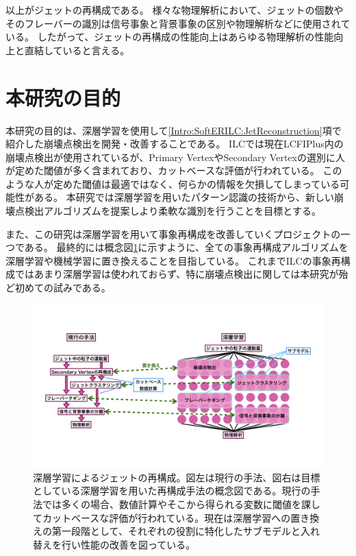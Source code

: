以上がジェットの再構成である。
様々な物理解析において、ジェットの個数やそのフレーバーの識別は信号事象と背景事象の区別や物理解析などに使用されている。
したがって、ジェットの再構成の性能向上はあらゆる物理解析の性能向上と直結していると言える。


\section{本研究の目的} \label{Intro:Purpose}

本研究の目的は、深層学習を使用して\ref{Intro:SoftERILC:JetReconstruction}項で紹介した崩壊点検出を開発・改善することである。
ILCでは現在LCFIPlus内の崩壊点検出が使用されているが、Primary VertexやSecondary Vertexの選別に人が定めた閾値が多く含まれており、カットベースな評価が行われている。
このような人が定めた閾値は最適ではなく、何らかの情報を欠損してしまっている可能性がある。
本研究では深層学習を用いたパターン認識の技術から、新しい崩壊点検出アルゴリズムを提案しより柔軟な識別を行うことを目標とする。

また、この研究は深層学習を用いて事象再構成を改善していくプロジェクトの一つである。
最終的には概念図\ref{7JetReconstructionwithDeepLearning}に示すように、全ての事象再構成アルゴリズムを深層学習や機械学習に置き換えることを目指している。
これまでILCの事象再構成ではあまり深層学習は使われておらず、特に崩壊点検出に関しては本研究が殆ど初めての試みである。

\begin{figure}[htbp]
 \centering
 \includegraphics[trim = 0 100 0 50, width=1.0\textwidth, clip]{Figure/1Introduction/7JetReconstructionwithDeepLearning.png}
 \caption[深層学習によるジェットの再構成]{深層学習によるジェットの再構成。図左は現行の手法、図右は目標としている深層学習を用いた再構成手法の概念図である。現行の手法では多くの場合、数値計算やそこから得られる変数に閾値を課してカットベースな評価が行われている。現在は深層学習への置き換えの第一段階として、それぞれの役割に特化したサブモデルと入れ替えを行い性能の改善を図っている。}
 \label{7JetReconstructionwithDeepLearning}
\end{figure}

